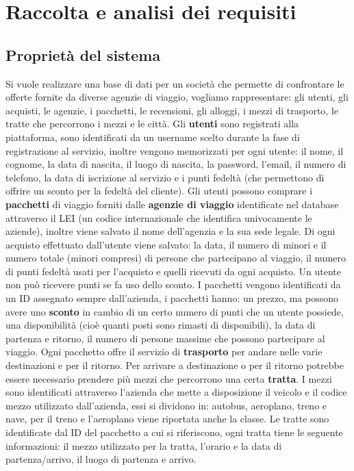 \section{Raccolta e analisi dei requisiti}
\subsection{Proprietà del sistema}
%
%
Si vuole realizzare una base di dati per un società che permette di confrontare le offerte fornite da diverse agenzie di viaggio, vogliamo rappresentare: gli utenti, gli acquisti, le agenzie, i pacchetti, le recensioni, gli alloggi, i mezzi di trasporto, le tratte che percorrono i mezzi e le città.
%
%
Gli \textbf{utenti} sono registrati alla piattaforma, sono identificati da un username scelto durante la fase di registrazione al servizio, inoltre vengono memorizzati per ogni utente: il nome, il cognome, la data di nascita, il luogo di nascita, la password, l'email, il numero di telefono, la data di iscrizione al servizio e i punti fedeltà (che permettono di offrire un sconto per la fedeltà del cliente).
%
%
Gli utenti possono comprare i \textbf{pacchetti} di viaggio forniti dalle \textbf{agenzie di viaggio} identificate nel database attraverso il LEI (un codice internazionale che identifica univocamente le aziende), inoltre viene salvato il nome dell'agenzia e la sua sede legale. Di ogni acquisto effettuato dall'utente viene salvato: la data, il numero di minori e il numero totale (minori compresi) di persone che partecipano al viaggio, il numero di punti fedeltà usati per l'acquisto e quelli ricevuti da ogni acquisto. Un utente non può ricevere punti se fa uso dello sconto.
%
%
I pacchetti vengono identificati da un ID assegnato sempre dall'azienda, i pacchetti hanno: un prezzo, ma possono avere uno \textbf{sconto} in cambio di un certo numero di punti che un utente possiede, una disponibilità (cioè quanti posti sono rimasti di disponibili), la data di partenza e ritorno, il numero di persone massime che possono partecipare al viaggio.
%
%
Ogni pacchetto offre il servizio di \textbf{trasporto} per andare nelle varie destinazioni e per il ritorno. Per arrivare a destinazione o per il ritorno potrebbe essere necessario prendere più mezzi che percorrono una certa \textbf{tratta}. I mezzi sono identificati attraverso l'azienda che mette a disposizione il veicolo e il codice mezzo utilizzato dall'azienda, essi si dividono in: autobus, aeroplano, treno e nave, per il treno e l'aeroplano viene riportata anche la classe. Le tratte sono identificate dal ID del pacchetto a cui si riferiscono, ogni tratta tiene le seguente informazioni: il mezzo utilizzato per la tratta, l'orario e la data di partenza/arrivo, il luogo di partenza e arrivo.
